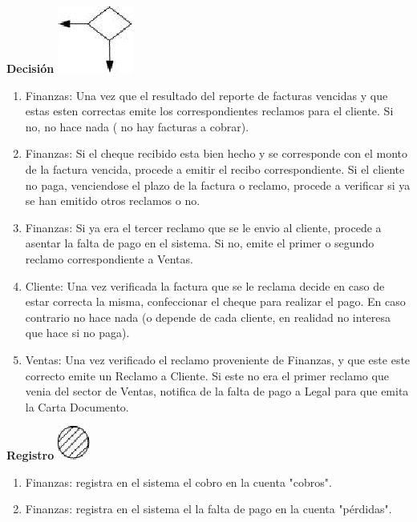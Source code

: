 \begin{center}
  \textbf{Decisión}
  \includegraphics{../../../Images/Simbolos/simbolo-Decision.png}
\end{center}
\begin{enumerate}
\item Finanzas: Una vez que el resultado del reporte de facturas vencidas y que estas esten correctas emite los correspondientes reclamos para el cliente. Si no, no hace nada ( no hay facturas a cobrar).
\item Finanzas: Si el cheque recibido esta bien hecho y se corresponde con el monto de la factura vencida, procede a emitir el recibo correspondiente. Si el cliente no paga, venciendose el plazo de la factura o reclamo, procede a verificar si ya se han emitido otros reclamos o no.
\item Finanzas: Si ya era el tercer reclamo que se le envio al cliente, procede a asentar la falta de pago en el sistema. Si no, emite el primer o segundo reclamo correspondiente a Ventas.
\item Cliente: Una vez verificada la factura que se le reclama decide en caso de estar correcta la misma, confeccionar el cheque para realizar el pago. En caso contrario no hace nada (o depende de cada cliente, en realidad no interesa que hace si no paga).
\item Ventas: Una vez verificado el reclamo proveniente de Finanzas, y que este este correcto emite un Reclamo a Cliente. Si este no era el primer reclamo que venia del sector de Ventas, notifica de la falta de pago a Legal para que emita la Carta Documento.
\end{enumerate}

\begin{center}
  \textbf{Registro}
  \includegraphics{../../../Images/Simbolos/simbolo-Registro.png}
\end{center}
\begin{enumerate}
\item Finanzas: registra en el sistema el cobro en la cuenta "cobros".
\item Finanzas: registra en el sistema el la falta de pago en la cuenta "pérdidas".
\end{enumerate}

